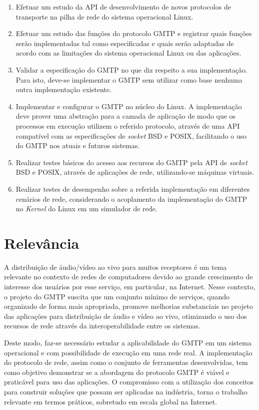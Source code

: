 \begin{enumerate}
\item Efetuar um estudo da API de desenvolvimento de novos protocolos de transporte na pilha de rede do sistema operacional Linux.
\item Efetuar um estudo das funções do protocolo GMTP e registrar quais funções serão implementadas tal como especificadas e quais serão adaptadas de acordo com as limitações do sistema operacional Linux ou das aplicações.
\item Validar a especificação do GMTP no que diz respeito a sua implementação. Para isto, deve-se implementar o GMTP sem utilizar como base nenhuma outra implementação existente.
\item Implementar e configurar o GMTP no núcleo do Linux. A implementação deve prover uma abstração para a camada de aplicação de modo que os processos em execução utilizem o referido protocolo, através de uma API compatível com as especificações de \textit{socket} BSD e POSIX, facilitando o uso do GMTP nos atuais e futuros sistemas. 
\item Realizar testes básicos do acesso aos recursos do GMTP pela API de \textit{socket} BSD e POSIX, através de aplicações de rede, utilizando-se máquinas virtuais.
\item Realizar testes de desempenho sobre a referida implementação em diferentes cenários de rede, considerando o acoplamento da implementação do GMTP no \textit{Kernel} do Linux em um simulador de rede. 
\end{enumerate}


% 
% 
% 
% 
\section{Relevância}
\label{sec:relevancia}

A distribuição de áudio/vídeo ao vivo para muitos receptores é um tema relevante no contexto de redes de computadores devido ao grande crescimento de interesse dos usuários por esse serviço, em particular, na Internet.  
Nesse contexto, o projeto do GMTP suscita que um conjunto mínimo de serviços, quando organizado de forma mais apropriada, promove melhorias substanciais no projeto das aplicações para distribuição de áudio e vídeo ao vivo, otimizando o uso dos recursos de rede através da interoperabilidade entre os sistemas.

Deste modo, faz-se necessário estudar a aplicabilidade do GMTP em um sistema operacional e com possibilidade de execução em uma rede real. 
A implementação do protocolo de rede, assim como o conjunto de ferramentas desenvolvidas, tem como objetivo demonstrar se a abordagem do protocolo GMTP é viável e praticável para uso das aplicações.
O compromisso com a utilização dos conceitos para construir soluções que possam ser aplicadas na indústria, torna o trabalho relevante em termos práticos, sobretudo em escala global na Internet.

